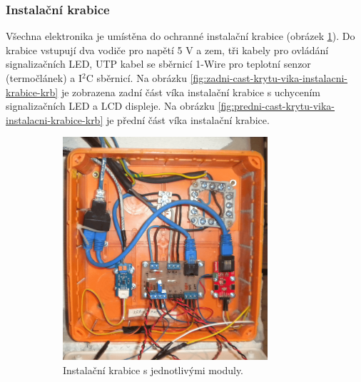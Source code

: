\subsubsection{Instalační krabice}
Všechna elektronika je umístěna do ochranné instalační krabice (obrázek \ref{fig:instalacni-krabice-vnitrek-krb}). Do krabice vstupují dva vodiče pro napětí 5 V a zem, tři kabely pro ovládání signalizačních LED, UTP kabel se sběrnicí 1-Wire pro teplotní senzor (termočlánek) a I$^2$C sběrnicí. Na obrázku \ref{fig:zadni-cast-krytu-vika-instalacni-krabice-krb} je zobrazena zadní část víka instalační krabice s uchycením signalizačních LED a LCD displeje. Na obrázku \ref{fig:predni-cast-krytu-vika-instalacni-krabice-krb} je přední část víka instalační krabice.

\begin{figure}[H]
\centering
\begin{subfigure}{.5\textwidth}
  \centering
  \includegraphics[width=0.835\textwidth]{images/krb/instalacni-krabice-vnitrek-krb.png}
  \caption{Instalační krabice s jednotlivými moduly.}
  \label{fig:instalacni-krabice-vnitrek-krb}
\end{subfigure}%
\begin{subfigure}{.5\textwidth}
  \centering

\end{subfigure}
\end{figure}

